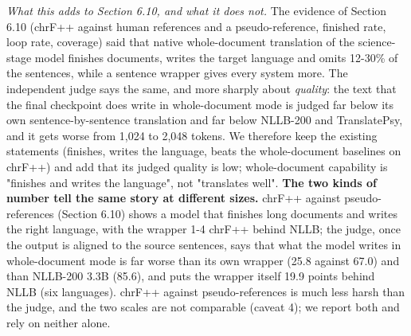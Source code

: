 \emph{What this adds to Section 6.10, and what it does not.} The evidence of Section 6.10 (chrF++ against human references and a pseudo-reference, finished rate, loop rate, coverage) said that native whole-document translation of the science-stage model finishes documents, writes the target language and omits 12-30\% of the sentences, while a sentence wrapper gives every system more. The independent judge says the same, and more sharply about \emph{quality}: the text that the final checkpoint does write in whole-document mode is judged far below its own sentence-by-sentence translation and far below NLLB-200 and TranslatePsy, and it gets worse from 1,024 to 2,048 tokens. We therefore keep the existing statements (finishes, writes the language, beats the whole-document baselines on chrF++) and add that its judged quality is low; whole-document capability is "finishes and writes the language", not "translates well". \textbf{The two kinds of number tell the same story at different sizes.} chrF++ against pseudo-references (Section 6.10) shows a model that finishes long documents and writes the right language, with the wrapper 1-4 chrF++ behind NLLB; the judge, once the output is aligned to the source sentences, says that what the model writes in whole-document mode is far worse than its own wrapper (25.8 against 67.0) and than NLLB-200 3.3B (85.6), and puts the wrapper itself 19.9 points behind NLLB (six languages). chrF++ against pseudo-references is much less harsh than the judge, and the two scales are not comparable (caveat 4); we report both and rely on neither alone.

